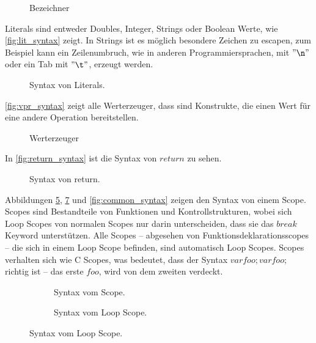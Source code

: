       \begin{figure}[H]
        \centering
        \caption{Bezeichner}
        \label{fig:id_syntax}
      \end{figure}

      Literals sind entweder Doubles, Integer, Strings oder Boolean Werte, wie \autoref{fig:lit_syntax} zeigt. In Strings ist es möglich besondere Zeichen zu escapen, zum Beispiel kann ein Zeilenumbruch, wie in anderen Programmiersprachen, mit \myMIn$"\n"$ oder ein Tab mit \myMIn$"\t"$, erzeugt werden.
      \begin{figure}[H]
        \centering
        \caption{Syntax von Literals.}
        \label{fig:lit_syntax}
      \end{figure}

      \autoref{fig:vpr_syntax} zeigt alle Werterzeuger, dass sind Konstrukte, die einen Wert für eine andere Operation bereitstellen.
      \begin{figure}[H]
        \centering
        \caption{Werterzeuger}
        \label{fig:vpr_syntax}
      \end{figure}

      In \autoref{fig:return_syntax} ist die Syntax von \myMIn$return$ zu sehen.
      \begin{figure}[H]
        \centering
        \caption{Syntax von return.}
        \label{fig:return_syntax}
      \end{figure}

      Abbildungen \ref{fig:scope_syntax}, \ref{fig:loop_scope_syntax} und \ref{fig:common_syntax} zeigen den Syntax von einem Scope. Scopes sind Bestandteile von Funktionen und Kontrollstrukturen, wobei sich Loop Scopes von normalen Scopes nur darin unterscheiden, dass sie das \myMIn$break$ Keyword unterstützen. Alle Scopes -- abgesehen von Funktionsdeklarationsscopes -- die sich in einem Loop Scope befinden, sind automatisch Loop Scopes. Scopes verhalten sich wie C Scopes, was bedeutet, dass der Syntax \myMIn$var foo; {var foo;}$ richtig ist -- das erste \myMIn$foo$, wird von dem zweiten verdeckt.
      \begin{figure}[H]
        \centering
        \begin{minipage}{.45\linewidth}
          \vspace*{2.45em}
          \begin{figure}[H]
            \centering
            \caption{Syntax vom Scope.}
            \label{fig:scope_syntax}
          \end{figure}
        \end{minipage}%
        \begin{minipage}{.45\linewidth}
          \begin{figure}[H]
            \centering
            \caption{Syntax vom Loop Scope.}
            \label{fig:loop_scope_syntax}
          \end{figure}
        \end{minipage}
      \end{figure}

